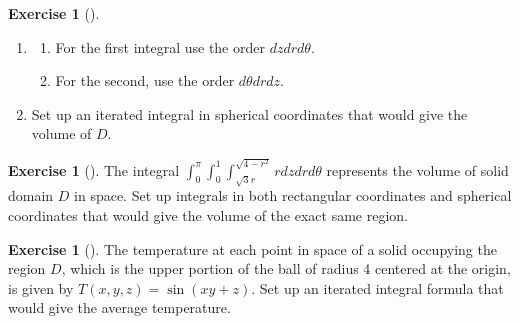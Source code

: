 \documentclass[10pt,]{book}
\theoremstyle{plain}
\theoremstyle{definition}
\theoremstyle{definition}
\theoremstyle{definition}
\theoremstyle{definition}
\newtheorem{exploration}[project]{Exercise}
\theoremstyle{definition}
\numberwithin{equation}{section}
\newcommand{\ds}{\displaystyle}
\begin{document}
\begin{exploration}[]\label{exploration-306}
\leavevmode%
\begin{enumerate}[font=\bfseries,label=(\alph*),ref=\alph*]
\item\label{task-835} \begin{enumerate}[font=\bfseries,label=(\roman*),ref=\theenumi.\roman*]
\item\label{task-836} For the first integral use the order \(dzdrd\theta\).%
\item\label{task-837} For the second, use the order \(d\theta dr dz\).%
\end{enumerate}
\item\label{task-838} Set up an iterated integral in spherical coordinates that would give the volume of \(D\).%
\end{enumerate}
\end{exploration}
\begin{exploration}[]\label{exploration-307}
The integral \(\ds\int_{0}^{\pi}\int_{0}^{1}\int_{\sqrt{3}r}^{\sqrt{4-r^2}}rdzdrd\theta\) represents the volume of solid domain \(D\) in space. Set up integrals in both rectangular coordinates and spherical coordinates that would give the volume of the exact same region.%
\end{exploration}
\begin{exploration}[]\label{exploration-308}
The temperature at each point in space of a solid occupying the region {\(D\)}, which is the upper portion of the ball of radius 4 centered at the origin, is given by \(T(x,y,z) = \sin(xy+z)\). Set up an iterated integral formula that would give the average temperature.%
\end{exploration}
\typeout{************************************************}
\typeout{************************************************}
\end{document}
